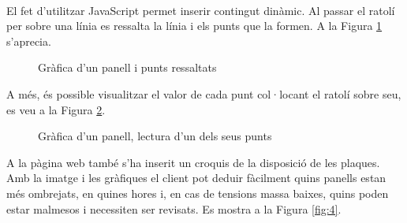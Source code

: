 \begin{spacing}{1.5}
\noindent \\ El fet d'utilitzar JavaScript permet inserir contingut dinàmic. Al passar el ratolí per sobre una línia es ressalta la línia i els punts que la formen. A la Figura \ref{fig:2} s'aprecia.
\begin{figure}[H]
\begin{center}
\end{center}
\caption{Gràfica d'un panell i punts ressaltats}
\label{fig:2}
\end{figure}

\noindent A més, és possible visualitzar el valor de cada punt col·locant el ratolí sobre seu, es veu a la Figura \ref{fig:3}.
\begin{figure}[H]
\begin{center}
\end{center}
\caption{Gràfica d'un panell, lectura d'un dels seus punts}
\label{fig:3}
\end{figure}

\noindent A la pàgina web també s'ha inserit un croquis de la disposició de les plaques. Amb la imatge i les gràfiques el client pot deduir fàcilment quins panells estan més ombrejats, en quines hores i, en cas de tensions massa baixes, quins poden estar malmesos i necessiten ser revisats. Es mostra a la Figura \ref{fig:4}.


\end{spacing}
